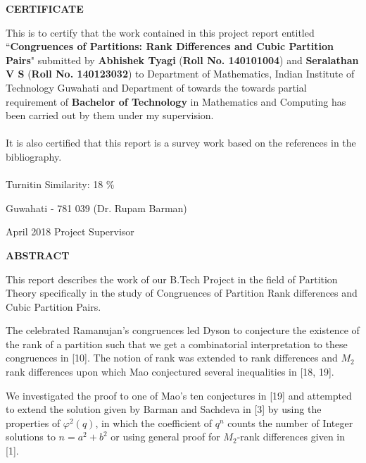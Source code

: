 \documentclass[12pt,a4paper]{report}
\theoremstyle{plain}
\theoremstyle{definition}
\theoremstyle{remark}
\begin{document}
\clearpage

 \setcounter{page}{2}
\begin{center}
{\Large{\bf{CERTIFICATE}}}
\end{center}


\noindent
This is to certify that the work contained in this project report entitled ``{\bf Congruences of Partitions: Rank Differences and Cubic Partition Pairs}" submitted by {\bf Abhishek Tyagi} ({\bf Roll No. 140101004}) and {\bf Seralathan V S} ({\bf Roll No. 140123032}) to Department of Mathematics, Indian Institute of Technology Guwahati and Department of  towards the towards partial requirement of \textbf{Bachelor of Technology} in Mathematics and Computing has been carried out by them under my supervision.
\\\\
\noindent
It is also certified that this report is a survey work based on the references
in the bibliography.\\\\
\noindent
Turnitin Similarity: 18 \%

\vspace{4cm}

\noindent Guwahati - 781 039 \hfill (Dr. Rupam Barman)

\noindent April 2018 \hfill Project Supervisor

\clearpage

\begin{center}
{\Large{\bf{ABSTRACT}}}
\end{center}

This report describes the work of our B.Tech Project in the field of Partition Theory specifically in the study of Congruences of Partition Rank differences and Cubic Partition Pairs.

The celebrated Ramanujan's congruences led Dyson to conjecture the existence of the rank of a partition such that we get a combinatorial interpretation to these congruences in [10]. The notion of rank was extended to rank differences and $M_2$ rank differences upon which Mao conjectured several inequalities in [18, 19].

We investigated the proof to one of Mao's ten conjectures in [19] and attempted to extend the solution given by Barman and Sachdeva in [3] by using the properties of $\varphi^2(q)$, in which the coefficient of $q^n$ counts the number of Integer solutions to $n = a^2 + b^2$ or using general proof for $M_2$-rank differences given in [1].
\end{document}
